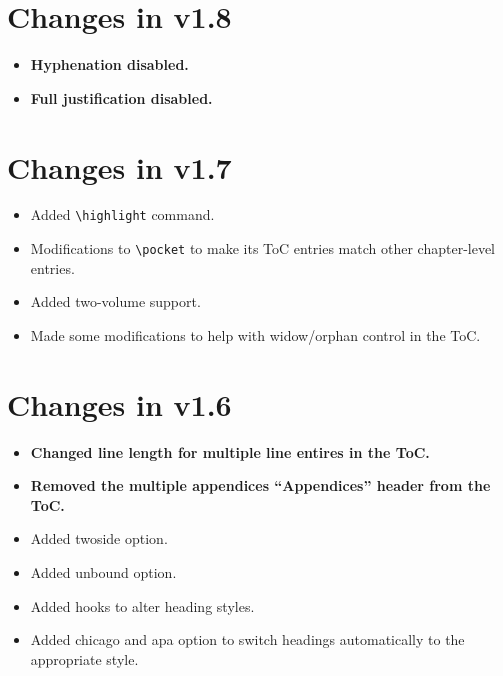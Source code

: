 \section{Changes in v1.8}
\begin{itemize}
\item{\textbf{Hyphenation disabled.}}
\item{\textbf{Full justification disabled.}}
\end{itemize}

\section{Changes in v1.7}
\begin{itemize}
\item{Added \verb=\highlight= command.}
\item{Modifications to \verb=\pocket= to make its ToC entries match other chapter-level entries.}
\item{Added two-volume support.}
\item{Made some modifications to help with widow/orphan control in the ToC.}
\end{itemize}

\section{Changes in v1.6}
\begin{itemize}
\item{\textbf{Changed line length for multiple line entires in the ToC.}}
\item{\textbf{Removed the multiple appendices ``Appendices'' header from the ToC.}}
\item{Added twoside option.}
\item{Added unbound option.}
\item{Added hooks to alter heading styles.}
\item{Added chicago and apa option to switch headings automatically to the appropriate style.}
\end{itemize}

